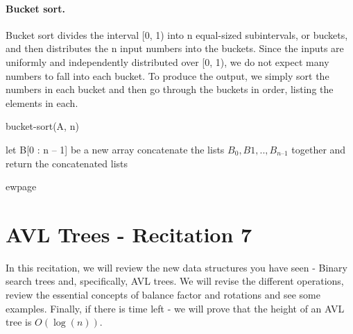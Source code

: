 \paragraph{Bucket sort.}
Bucket sort divides the interval [0, 1) into n equal-sized subintervals, or buckets, and then distributes the n input numbers into the buckets. Since the inputs are uniformly and independently distributed over [0, 1), we do not expect many numbers to fall into each bucket. To produce the output, we simply sort the numbers in each bucket and then go through the buckets in order, listing the elements in each.

\begin{algbox}{bucket-sort(A, n)}
  \begin{algorithm}[H]
    	let B[0 : n – 1] be a new array
	\For{ $i \leftarrow [1, n]$}{
	    insert $A_{i}$ into list $B_{ \lfloor n A_{i} \rfloor} ]$
       	}
	concatenate the lists $B_{0}, B{1}, .. , B_{n – 1}$ together and\\
	return the concatenated lists
  \end{algorithm}
\end{algbox}




ewpage\section{AVL Trees  - Recitation 7} 


    In this recitation, we will review the new data structures you have seen - Binary search trees and, specifically, AVL trees. We will revise the different operations, review the essential concepts of balance factor and rotations and see some examples. Finally, if there is time left - we will prove that the height of an AVL tree is $O(\log(n))$.
    
